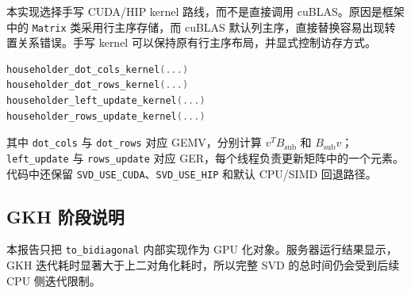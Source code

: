 \documentclass[UTF8,a4paper,10pt]{ctexart}
\begin{document}
本实现选择手写 CUDA/HIP kernel 路线，而不是直接调用 cuBLAS。原因是框架中的 \texttt{Matrix} 类采用行主序存储，而 cuBLAS 默认列主序，直接替换容易出现转置关系错误。手写 kernel 可以保持原有行主序布局，并显式控制访存方式。

\begin{lstlisting}[language=C++,title=GPU Householder kernels]
householder_dot_cols_kernel(...)
householder_dot_rows_kernel(...)
householder_left_update_kernel(...)
householder_rows_update_kernel(...)
\end{lstlisting}

其中 \texttt{dot\_cols} 与 \texttt{dot\_rows} 对应 GEMV，分别计算 $v^T B_{\text{sub}}$ 和 $B_{\text{sub}}v$；\texttt{left\_update} 与 \texttt{rows\_update} 对应 GER，每个线程负责更新矩阵中的一个元素。代码中还保留 \texttt{SVD\_USE\_CUDA}、\texttt{SVD\_USE\_HIP} 和默认 CPU/SIMD 回退路径。

\subsection{GKH 阶段说明}
本报告只把 \texttt{to\_bidiagonal} 内部实现作为 GPU 化对象。服务器运行结果显示，GKH 迭代耗时显著大于上二对角化耗时，所以完整 SVD 的总时间仍会受到后续 CPU 侧迭代限制。
\end{document}
